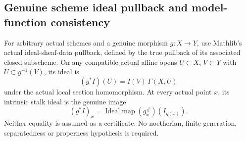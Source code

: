 \subsection{Genuine scheme ideal pullback and model-function consistency}
\label{subsec:native-model-ideal-pullback}

\begin{theorem}
\label{scheme:genuine-ideal-pullback-stalk}
\leanok
{}
For arbitrary actual schemes and a genuine morphism $g:X\to Y$, use
Mathlib's actual ideal-sheaf-data pullback, defined by the true pullback
of its associated closed subscheme. On any compatible actual affine
opens $U\subset X$, $V\subset Y$ with $U\subset g^{-1}(V)$, its ideal is
\[
 (g^*I)(U)=I(V)\,\Gamma(X,U)
\]
under the actual local section homomorphism. At every actual point $x$,
its intrinsic stalk ideal is the genuine image
\[
 (g^*I)_x=\operatorname{Ideal.map}(g_x^\#)(I_{g(x)}).
\]
Neither equality is assumed as a certificate. No noetherian, finite
generation, separatedness or properness hypothesis is required.
\end{theorem}
